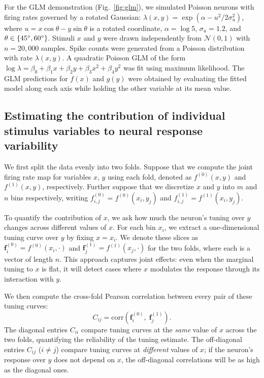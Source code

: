 \documentclass[11pt]{article}
\begin{document}
For the GLM demonstration (Fig.~\ref{fig:glm}), we simulated Poisson neurons with firing rates governed by a rotated Gaussian: $\lambda(x,y) = \exp(\alpha - u^2 / 2\sigma_u^2)$, where $u = x \cos\theta - y \sin\theta$ is a rotated coordinate, $\alpha = \log 5$, $\sigma_u = 1.2$, and $\theta \in \{45\degree, 60\degree\}$. Stimuli $x$ and $y$ were drawn independently from $\mathcal{N}(0, 1)$ with $n = 20{,}000$ samples. Spike counts were generated from a Poisson distribution with rate $\lambda(x, y)$. A quadratic Poisson GLM of the form $\log \lambda = \beta_0 + \beta_1 x + \beta_2 y + \beta_3 x^2 + \beta_4 y^2$ was fit using maximum likelihood. The GLM predictions for $f(x)$ and $g(y)$ were obtained by evaluating the fitted model along each axis while holding the other variable at its mean value.

\subsection{Estimating the contribution of individual stimulus variables to neural response variability}
We first split the data evenly into two folds. Suppose that we compute the joint firing rate map for variables $x$, $y$ using each fold, denoted as $f^{(0)}(x,y)$ and $f^{(1)}(x,y)$, respectively. Further suppose that we discretize $x$ and $y$ into $m$ and $n$ bins respectively, writing $f^{(0)}_{i,j} = f^{(0)}(x_i, y_j)$ and $f^{(1)}_{i,j} = f^{(1)}(x_i, y_j)$.

To quantify the contribution of $x$, we ask how much the neuron's tuning over $y$ changes across different values of $x$. For each bin $x_i$, we extract a one-dimensional tuning curve over $y$ by fixing $x = x_i$. We denote these slices as $\mathbf{f}^{(0)}_i = f^{(0)}(x_i, \cdot)$ and $\mathbf{f}^{(1)}_j = f^{(1)}(x_j, \cdot)$ for the two folds, where each is a vector of length $n$. This approach captures joint effects: even when the marginal tuning to $x$ is flat, it will detect cases where $x$ modulates the response through its interaction with $y$.

We then compute the cross-fold Pearson correlation between every pair of these tuning curves:
\begin{equation}
C_{ij} = \mathrm{corr}\!\left(\mathbf{f}^{(0)}_i, \; \mathbf{f}^{(1)}_j\right).
\label{eq:1}
\end{equation}
The diagonal entries $C_{ii}$ compare tuning curves at the \emph{same} value of $x$ across the two folds, quantifying the reliability of the tuning estimate. The off-diagonal entries $C_{ij}$ ($i \neq j$) compare tuning curves at \emph{different} values of $x$; if the neuron's response over $y$ does not depend on $x$, the off-diagonal correlations will be as high as the diagonal ones.
\end{document}
